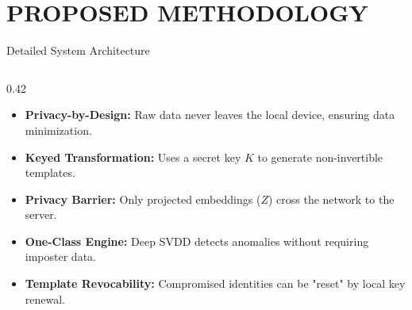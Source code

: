
\section{PROPOSED METHODOLOGY}


\begin{frame}{Detailed System Architecture}
    \vspace{-0.6cm} 
    \begin{columns}[T] %
        
        \begin{column}{0.42\textwidth}
            \vspace{0.8cm}
            \begin{itemize}
                \setlength{\itemsep}{9pt}
                \item \scriptsize \textbf{Privacy-by-Design:} Raw data never leaves the local device, ensuring data minimization.
                \item \scriptsize \textbf{Keyed Transformation:} Uses a secret key $K$ to generate non-invertible templates.
                \item \scriptsize \textbf{Privacy Barrier:} Only projected embeddings ($Z$) cross the network to the server.
                \item \scriptsize \textbf{One-Class Engine:} Deep SVDD detects anomalies without requiring imposter data.
                \item \scriptsize \textbf{Template Revocability:} Compromised identities can be "reset" by local key renewal.
            \end{itemize}
        \end{column}


\end{columns}
\end{frame}
